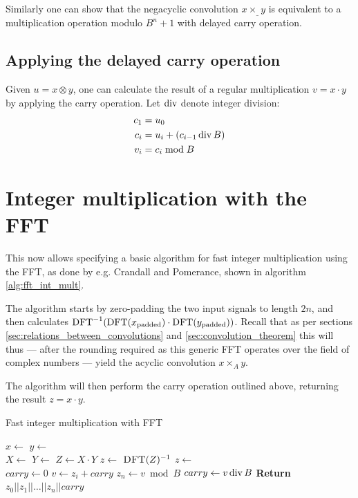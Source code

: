 Similarly one can show that the negacyclic convolution $x \times_{\_} y$ is
equivalent to a multiplication operation modulo $B^n + 1$ with delayed carry
operation.

\subsection{Applying the delayed carry operation}

Given $u = x \otimes y$, one can calculate the result of a regular
multiplication $v = x \cdot y$ by applying the carry operation. Let
$\operatorname{div}$ denote integer division:
\begin{align*}
		c_1 & = u_0 \\
		c_i & = u_i + (c_{i-1} \operatorname{div} B) \\
		v_i & = c_i \bmod B
\end{align*}

\section{Integer multiplication with the FFT}

This now allows specifying a basic algorithm for fast integer multiplication
using the FFT, as done by e.g. Crandall and Pomerance, shown in algorithm
\ref{alg:fft_int_mult}.\autocite{crandallPrimeNumbersComputational2005}

The algorithm starts by zero-padding the two input signals to length $2n$, and
then calculates $\operatorname{DFT}^{-1}(\operatorname{DFT}(x_{\text{padded}}) \cdot
\operatorname{DFT}(y_{\text{padded}}))$.  Recall that as per sections
\ref{sec:relations_between_convolutions} and \ref{sec:convolution_theorem} this
will thus --- after the rounding required as this generic FFT operates over the
field of complex numbers --- yield the acyclic convolution $x \times_A y$.

The algorithm will then perform the carry operation outlined above, returning
the result $z = x \cdot y$.

\begin{algorithm}
		\caption{Fast integer multiplication with FFT}
		\begin{algorithmic}[1]
				\State $x \gets$  
				\State $y \gets$ 
				\\
				\State $X \gets$ 
				\State $Y \gets$ 
				\State $Z \gets X \cdot Y$ 
				\State $z \gets$ $\Call{DFT}{Z}^{-1}$
				\State $z \gets$ 
				\\
				\State $carry \gets 0$
				\State $v \gets z_i + carry$
				\State $z_n \gets v \bmod B$
				\State $carry \gets v \operatorname{div} B$
				\EndFor
				\State \textbf{Return} $z_0 || z_1 || \ldots || z_n || carry$
				\EndFunction
		\end{algorithmic}
		\label{alg:fft_int_mult}
\end{algorithm}

